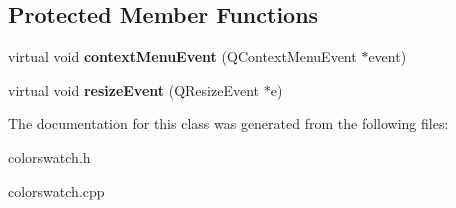 \subsection*{Protected Member Functions}
\begin{DoxyCompactItemize}
\item 
\hypertarget{class_color_swatch_a0a5251704978879c5bc4456cd3240d78}{virtual void {\bfseries context\-Menu\-Event} (Q\-Context\-Menu\-Event $\ast$event)}\label{class_color_swatch_a0a5251704978879c5bc4456cd3240d78}

\item 
\hypertarget{class_color_swatch_a2cfb57e4968c2e8546ec0c8d9f5be0c2}{virtual void {\bfseries resize\-Event} (Q\-Resize\-Event $\ast$e)}\label{class_color_swatch_a2cfb57e4968c2e8546ec0c8d9f5be0c2}

\end{DoxyCompactItemize}


The documentation for this class was generated from the following files\-:\begin{DoxyCompactItemize}
\item 
colorswatch.\-h\item 
colorswatch.\-cpp\end{DoxyCompactItemize}
